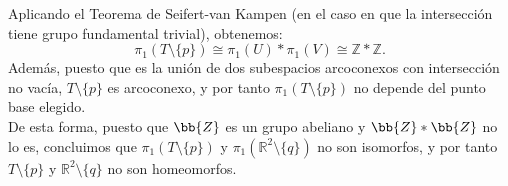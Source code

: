 \documentclass[12pt]{article}
\begin{document}
\begin{ejercicio}
        Aplicando el Teorema de Seifert-van Kampen (en el caso en que la intersección tiene grupo fundamental trivial), obtenemos:
        \begin{equation*}
            \pi_1(T \setminus \{p\}) \cong \pi_1(U) \ast \pi_1(V) \cong \mathbb{Z} \ast \mathbb{Z}.
        \end{equation*}
        Además, puesto que es la unión de dos subespacios arcoconexos con intersección no vacía, $T \setminus \{p\}$ es arcoconexo, y por tanto $\pi_1(T \setminus \{p\})$ no depende del punto base elegido.\\

        De esta forma, puesto que $\bb{Z}$ es un grupo abeliano y $\bb{Z} \ast \bb{Z}$ no lo es, concluimos que $\pi_1(T \setminus \{p\})$ y $\pi_1(\mathbb{R}^2 \setminus \{q\})$ no son isomorfos, y por tanto $T \setminus \{p\}$ y $\mathbb{R}^2 \setminus \{q\}$ no son homeomorfos.
    \end{ejercicio}
\end{document}

